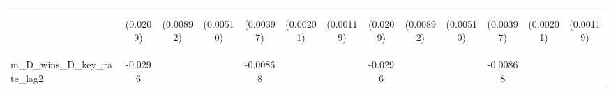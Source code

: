 \documentclass[]{article}
\begin{document}
\begin{center}
\begin{tabular}{lcccccccccccc}
\vspace{4pt} & \begin{footnotesize}(0.0209)\end{footnotesize} & \begin{footnotesize}(0.00892)\end{footnotesize} & \begin{footnotesize}(0.00510)\end{footnotesize} & \begin{footnotesize}(0.00397)\end{footnotesize} & \begin{footnotesize}(0.00201)\end{footnotesize} & \begin{footnotesize}(0.00119)\end{footnotesize} & \begin{footnotesize}(0.0209)\end{footnotesize} & \begin{footnotesize}(0.00892)\end{footnotesize} & \begin{footnotesize}(0.00510)\end{footnotesize} & \begin{footnotesize}(0.00397)\end{footnotesize} & \begin{footnotesize}(0.00201)\end{footnotesize} & \begin{footnotesize}(0.00119)\end{footnotesize} \\
m\_D\_wins\_D\_key\_rate\_lag2 & -0.0296 &  &  & -0.00868 &  &  & -0.0296 &  &  & -0.00868 &  &  \\

\end{tabular}
\end{center}
\end{document}
